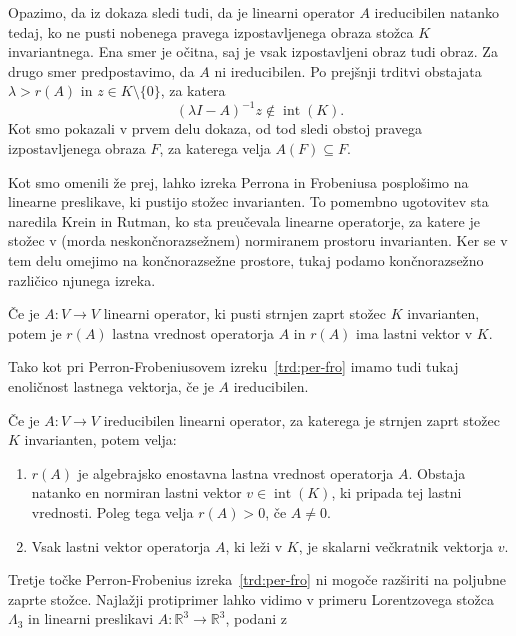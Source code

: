 \documentclass[mat2, tisk]{fmfdelo}
\begin{document}
Opazimo, da iz dokaza sledi tudi, da je linearni
operator $A$ ireducibilen natanko tedaj, ko ne pusti
nobenega pravega izpostavljenega obraza stožca $K$
invariantnega.
Ena smer je očitna, saj je vsak izpostavljeni obraz
tudi obraz. Za drugo smer predpostavimo, da $A$ ni
ireducibilen. Po prejšnji trditvi obstajata
$\lambda>r(A)$ in $z\in K\setminus\{0\}$, za katera
\[
(\lambda I-A)^{-1}z\notin\operatorname{int}(K).
\]
Kot smo pokazali v prvem delu dokaza, od tod sledi
obstoj pravega izpostavljenega obraza $F$, za
katerega velja $A(F)\subseteq F$.

Kot smo omenili že prej, lahko izreka Perrona in Frobeniusa posplošimo
na linearne preslikave, ki pustijo stožec invarianten. To pomembno
ugotovitev sta naredila Krein in Rutman, ko sta preučevala linearne 
operatorje, za katere je stožec v (morda neskončnorazsežnem) 
normiranem prostoru invarianten.
Ker se v tem delu omejimo na končnorazsežne prostore, tukaj
podamo končnorazsežno različico njunega izreka.

\begin{izrek}\label{Krein-Rutman}
  Če je \(A : V \to V\) linearni operator, ki pusti strnjen
zaprt stožec \(K\) invarianten, potem je \(r(A)\) 
lastna vrednost operatorja \(A\) in
\(r(A)\) ima lastni vektor v \(K\).
\end{izrek}

Tako kot pri Perron-Frobeniusovem izreku~\ref{trd:per-fro} imamo tudi tukaj
enoličnost lastnega vektorja, če je \(A\) ireducibilen.

\begin{izrek}
  Če je \(A : V \to V\) ireducibilen linearni operator, za katerega je
  strnjen zaprt stožec \(K\) invarianten, potem velja:

  \begin{enumerate}
  \item $r(A)$ je algebrajsko enostavna lastna vrednost operatorja $A$.
        Obstaja natanko en normiran lastni vektor $v\in\operatorname{int}(K)$,
        ki pripada tej lastni vrednosti. Poleg tega velja $r(A)>0$, če $A\neq 0$.
  \item Vsak lastni vektor operatorja $A$, ki leži v $K$,
        je skalarni večkratnik vektorja $v$.
  \end{enumerate}
\end{izrek}

Tretje točke Perron-Frobenius izreka~\ref{trd:per-fro} ni mogoče razširiti na poljubne
zaprte stožce. Najlažji protiprimer lahko vidimo v primeru Lorentzovega stožca $\Lambda_{3}$ in linearni
preslikavi $A : \mathbb{R}^{3} \to \mathbb{R}^{3}$, podani z
\end{document}
